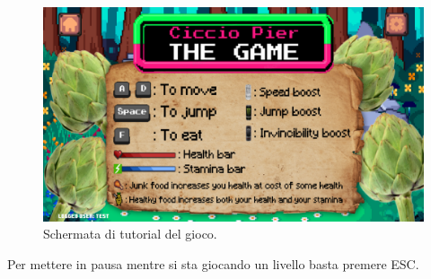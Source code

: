 \documentclass[a4paper,12pt]{report}
\begin{document}
    \begin{figure}[H]
        \centering{}
        \includegraphics[scale=0.2] {img/game-tutorial.png}
        \caption{Schermata di tutorial del gioco.}
        \label{img:game-tutorial}
    \end{figure}

    Per mettere in pausa mentre si sta giocando un livello basta premere ESC.

    
    
\end{document}
